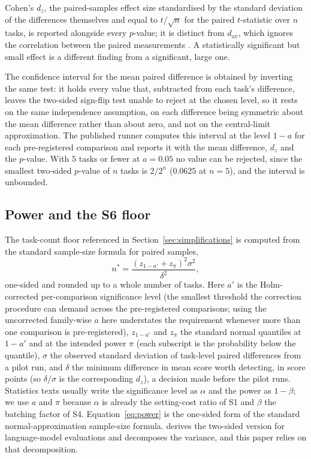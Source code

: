 \documentclass[11pt]{article}
\begin{document}
Cohen's
$d_z$, the paired-samples effect size standardised by the standard deviation of the
differences themselves and equal to $t/\sqrt{n}$ for the paired $t$-statistic over $n$ tasks, is reported
alongside every $p$-value; it is distinct from $d_{\text{av}}$, which
ignores the correlation between the paired measurements \citep{lakens2013}. A statistically
significant but small effect is a different finding from a significant, large one.

The confidence interval for the mean paired difference is obtained by inverting the same test: it holds every value that, subtracted from each task's difference, leaves the two-sided sign-flip test unable to reject at the chosen level, so it rests on the same independence assumption, on each difference being symmetric about the mean difference rather than about zero, and not on the central-limit approximation. The published runner computes this interval at the level $1-a$ for each pre-registered comparison and reports it with the mean difference, $d_z$ and the $p$-value. With $5$ tasks or fewer at $a = 0.05$ no value can be rejected, since the smallest two-sided $p$-value of $n$ tasks is $2/2^n$ ($0.0625$ at $n = 5$), and the interval is unbounded.

\subsection{Power and the S6 floor}
\label{sec:power}

The task-count floor referenced in Section~\ref{sec:simplifications} is computed from the
standard sample-size formula for paired samples,
\begin{equation}
n^* = \frac{(z_{1-a'} + z_{\pi})^2 \sigma^2}{\delta^2},
\label{eq:power}
\end{equation}
one-sided and rounded up to a whole number of tasks. Here $a'$ is the Holm-corrected per-comparison significance level (the smallest threshold the correction procedure can demand across the pre-registered comparisons; using the uncorrected family-wise $a$ here understates the requirement whenever more than one comparison is pre-registered), $z_{1-a'}$ and $z_{\pi}$ the standard normal quantiles at $1-a'$ and at the intended power $\pi$ (each subscript is the probability below the quantile), $\sigma$
the observed standard deviation of task-level paired differences from a pilot run, and
$\delta$ the minimum difference in mean score worth detecting, in score points (so $\delta/\sigma$ is the corresponding $d_z$), a decision made before the pilot runs. Statistics texts usually write the significance level as $\alpha$ and the power as $1-\beta$; we use $a$ and $\pi$ because $\alpha$ is already the setting-cost ratio of S1 and $\beta$ the batching factor of S4. Equation~\ref{eq:power} is the one-sided form of the standard
normal-approximation sample-size formula. \citet{miller2024errorbars} derives the
two-sided version for language-model evaluations and decomposes the variance, and this paper relies on that decomposition.
\end{document}
